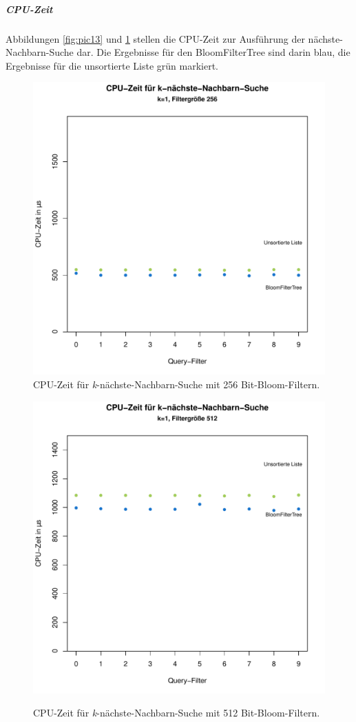 \subparagraph*{CPU-Zeit}
Abbildungen \ref{fig:pic13} und \ref{fig:pic14} stellen die CPU-Zeit zur Ausführung der nächste-Nachbarn-Suche dar. Die Ergebnisse für den BloomFilterTree sind darin blau, die Ergebnisse für die unsortierte Liste grün markiert.  
\begin{figure}[hptb]
	\centering
	\includegraphics[scale=0.7]{pictures/cputime_nn_256.pdf}\\
	\caption[CPU-Zeit für nächste-Nachbarn-Suche mit 256 Bit-Bloom-Filtern]{CPU-Zeit für \textit{k}-nächste-Nachbarn-Suche mit 256 Bit-Bloom-Filtern.}\label{fig:pic13}
	\includegraphics[scale=0.7]{pictures/cputime_nn_512.pdf}\\
	\caption[CPU-Zeit für nächste-Nachbarn-Suche mit 512 Bit-Bloom-Filtern]{CPU-Zeit für \textit{k}-nächste-Nachbarn-Suche mit 512 Bit-Bloom-Filtern.}\label{fig:pic14}
\end{figure}
